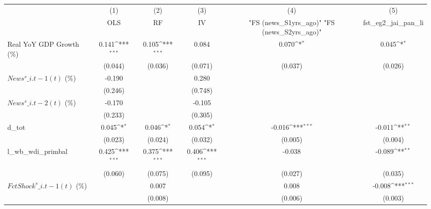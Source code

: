{
\def\sym#1{\ifmmode^{#1}\else\(^{#1}\)\fi}
\begin{tabular}{l*{5}{c}}
\toprule
                    &\multicolumn{1}{c}{(1)}&\multicolumn{1}{c}{(2)}&\multicolumn{1}{c}{(3)}&\multicolumn{1}{c}{(4)}&\multicolumn{1}{c}{(5)}\\
                    &\multicolumn{1}{c}{OLS}&\multicolumn{1}{c}{RF}&\multicolumn{1}{c}{IV}&\multicolumn{1}{c}{ "FS (news\_S1yrs\_ago)"  "FS (news\_S2yrs\_ago)" }&\multicolumn{1}{c}{fst\_eg2\_jai\_pan\_li}\\
\midrule
Real YoY GDP Growth (\%)&       0.141\sym{***}&       0.105\sym{***}&       0.084         &       0.070\sym{*}  &       0.045\sym{*}  \\
                    &     (0.044)         &     (0.036)         &     (0.071)         &     (0.037)         &     (0.026)         \\
\addlinespace
$ News^s\_{i.t-1}(t)$ (\%)&      -0.190         &                     &       0.280         &                     &                     \\
                    &     (0.246)         &                     &     (0.748)         &                     &                     \\
\addlinespace
$ News^s\_{i.t-2}(t)$ (\%)&      -0.170         &                     &      -0.105         &                     &                     \\
                    &     (0.233)         &                     &     (0.305)         &                     &                     \\
\addlinespace
d\_tot               &       0.045\sym{*}  &       0.046\sym{*}  &       0.054\sym{*}  &      -0.016\sym{***}&      -0.011\sym{**} \\
                    &     (0.023)         &     (0.024)         &     (0.032)         &     (0.005)         &     (0.004)         \\
\addlinespace
l\_wb\_wdi\_primbal    &       0.425\sym{***}&       0.375\sym{***}&       0.406\sym{***}&      -0.038         &      -0.089\sym{**} \\
                    &     (0.060)         &     (0.075)         &     (0.095)         &     (0.027)         &     (0.035)         \\
\addlinespace
$ FctShock^s\_{i.t-1}(t)$ (\%)&                     &       0.007         &                     &       0.008         &      -0.008\sym{***}\\
                    &                     &     (0.008)         &                     &     (0.006)         &     (0.003)         \\

\end{tabular}}
